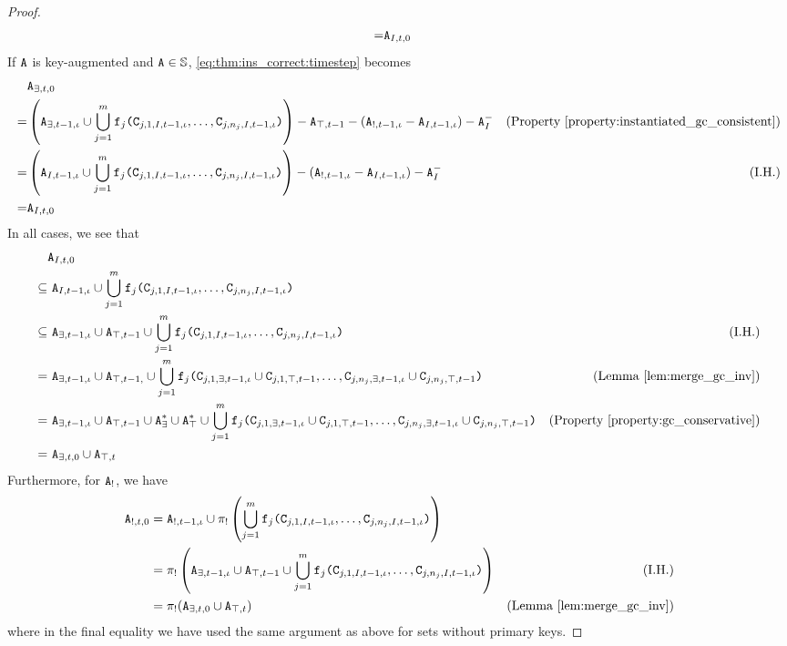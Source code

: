 \begin{proof}
\begin{align*}
=& \tt{A}_{I,t,0}
\end{align*}
If $\tt{A}$ is key-augmented and $\tt{A} \in \mathbb{S}$, \eqref{eq:thm:ins_correct:timestep} becomes
\begin{align*}
&\tt{A}_{\exists,t,0}\\
=& \left(\tt{A}_{\exists,t-1,\iota} \cup \bigcup_{j=1}^m \tt{f}_j\tt{(}\tt{C}_{j,1,I,t-1,\iota}, \dots, \tt{C}_{j,n_j,I,t-1,\iota}\tt{)}\right)
- \tt{A}_{\top,t-1} - (\tt{A}_{!,t-1,\iota} - \tt{A}_{I,t-1,\iota}) - \tt{A}_I^- & \text{(Property \ref{property:instantiated_gc_consistent})} 
\\
=& \left(\tt{A}_{I,t-1,\iota} \cup \bigcup_{j=1}^m \tt{f}_j\tt{(}\tt{C}_{j,1,I,t-1,\iota}, \dots, \tt{C}_{j,n_j,I,t-1,\iota}\tt{)}\right)
-(\tt{A}_{!,t-1,\iota} - \tt{A}_{I,t-1,\iota}) - \tt{A}_I^- & \text{(I.H.)}\\
=& \tt{A}_{I,t,0}
\end{align*}
In all cases, we see that
\begin{align*}
&\tt{A}_{I,t,0}\\
\subseteq&~ \tt{A}_{I,t-1,\iota} \cup \bigcup_{j=1}^m \tt{f}_j\tt{(}\tt{C}_{j,1,I,t-1,\iota}, \dots, \tt{C}_{j,n_j,I,t-1,\iota}\tt{)} \\
\subseteq&~ \tt{A}_{\exists,t-1,\iota} \cup \tt{A}_{\top,t-1} \cup \bigcup_{j=1}^m \tt{f}_j\tt{(}\tt{C}_{j,1,I,t-1,\iota}, \dots, \tt{C}_{j,n_j,I,t-1,\iota}\tt{)} & \text{(I.H.)} \\
=&~ \tt{A}_{\exists,t-1,\iota} \cup \tt{A}_{\top,t-1,} \cup \bigcup_{j=1}^m \tt{f}_j\tt{(}\tt{C}_{j,1,\exists,t-1,\iota} \cup \tt{C}_{j,1,\top,t-1}, \dots, \tt{C}_{j,n_j,\exists,t-1,\iota} \cup \tt{C}_{j,n_j,\top,t-1}\tt{)} & \text{(Lemma \ref{lem:merge_gc_inv})} \\
=&~ \tt{A}_{\exists,t-1,\iota} \cup \tt{A}_{\top,t-1} \cup \tt{A}_\exists^* \cup \tt{A}_\top^* \cup \bigcup_{j=1}^m \tt{f}_j\tt{(}\tt{C}_{j,1,\exists,t-1,\iota} \cup \tt{C}_{j,1,\top,t-1}, \dots, \tt{C}_{j,n_j,\exists,t-1,\iota} \cup \tt{C}_{j,n_j,\top,t-1}\tt{)} & \text{(Property \ref{property:gc_conservative})}\\
=&~ \tt{A}_{\exists,t,0} \cup \tt{A}_{\top,t}
\end{align*}
Furthermore, for $\tt{A}_!$, we have
\begin{align*}
\tt{A}_{!,t,0}
&= \tt{A}_{!,t-1,\iota} \cup \pi_!\left(\bigcup_{j=1}^m \tt{f}_j\tt{(}\tt{C}_{j,1,I,t-1,\iota}, \dots, \tt{C}_{j,n_j,I,t-1,\iota}\tt{)}\right)\\
&= \pi_!\left(\tt{A}_{\exists,t-1,\iota} \cup \tt{A}_{\top,t-1} \cup \bigcup_{j=1}^m \tt{f}_j\tt{(}\tt{C}_{j,1,I,t-1,\iota}, \dots, \tt{C}_{j,n_j,I,t-1,\iota}\tt{)}\right) & \text{(I.H.)} \\
&= \pi_!(\tt{A}_{\exists,t,0} \cup \tt{A}_{\top,t}) & \text{(Lemma \ref{lem:merge_gc_inv})}
\end{align*}
where in the final equality we have used the same argument as above for sets without primary keys.
\end{proof}
